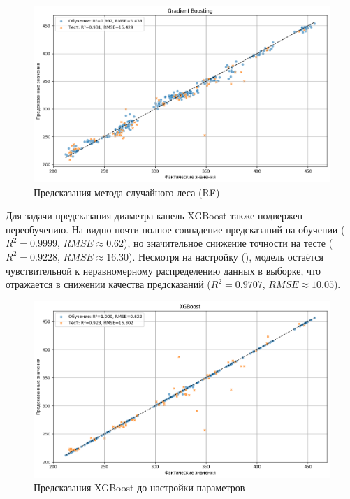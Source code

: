 \begin{figure}[htbp!]
	\centering
	\includegraphics[width=.9\linewidth]{my_folder/images/droplet_size/Gradient-Boosting.png}
	\caption{Предсказания метода случайного леса (RF)} 
	\label{fig:droplet-size-gbr}  
\end{figure}

Для задачи предсказания диаметра капель XGBoost также подвержен переобучению. На  видно почти полное совпадение предсказаний на обучении ($R^2 = 0.9999$, $RMSE \approx 0.62$), но значительное снижение точности на тесте ($R^2 = 0.9228$, $RMSE \approx 16.30$). Несмотря на настройку (), модель остаётся чувствительной к неравномерному распределению данных в выборке, что отражается в снижении качества предсказаний ($R^2 = 0.9707$, $RMSE \approx 10.05$).

\begin{figure}[htbp!]
	\centering
	\includegraphics[width=.9\linewidth]{my_folder/images/droplet_size/XGBoost-overfiting.png}
	\caption{Предсказания XGBoost до настройки параметров} 
	\label{fig:droplet-size-xgboost-overfit}  
\end{figure}


